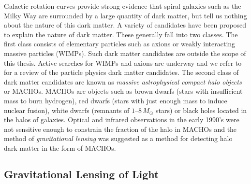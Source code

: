 Galactic rotation curves provide strong evidence that spiral galaxies such
as the Milky Way are surrounded by a large quantity of dark matter, but 
tell us nothing about the nature of this dark matter.  A variety of
candidates have been proposed to explain the nature of dark matter. These
generally fall into two classes. The first class consists of elementary
particles such as axions\cite{Weinberg:1977ma} or weakly interacting massive
particles (WIMPs)\cite{Goodman:1984dc}. 
Such dark matter candidates
are outside the scope of this thesis. Active searches for WIMPs and axions are
underway and we refer to \cite{Griest:1995gs} for a review of the particle
physics dark matter candidates.  The second class of dark matter candidates
are known as \emph{massive astrophysical compact halo objects} or MACHOs.
MACHOs are objects such as brown dwarfs (stars with insufficient mass to burn
hydrogen), red dwarfs (stars with just enough mass to induce nuclear fusion),
white dwarfs (remnants of $1$--$8\,M_\odot$ stars) or black holes located in
the halos of galaxies.  Optical and infrared observations in the early 1990's
were not sensitive enough to constrain the fraction of the halo in
MACHOs\cite{1994MNRAS.266..775K} and the method of \emph{gravitational
lensing} was suggested as a method for detecting halo dark matter in the form
of MACHOs\cite{Paczynski:1985jf}.

\subsection{Gravitational Lensing of Light}
\label{ss:microlensing}

